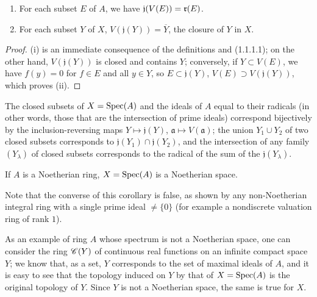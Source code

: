 \begin{proposition}[1.1.4]
\label{1.1.1.4}
\medskip\noindent
\begin{enumerate}
  \item[{\rm(i)}] For each subset $E$ of $A$, we have $\mathfrak{j}(V(E))=\mathfrak{r}(E)$.
  \item[{\rm(ii)}] For each subset $Y$ of $X$, $V(\mathfrak{j}(Y))=\overline{Y}$, the closure of $Y$ in $X$.
\end{enumerate}
\end{proposition}

\begin{proof}
\label{proof-1.1.1.4}
(i) is an immediate consequence of the definitions and (1.1.1.1);
on the other hand, $V(\mathfrak{j}(Y))$ is closed and contains $Y$;
conversely, if $Y\subset V(E)$, we have $f(y)=0$ for $f\in E$ and all $y\in Y$, so $E\subset\mathfrak{j}(Y)$, $V(E)\supset V(\mathfrak{j}(Y))$, which proves (ii).
\end{proof}

\begin{corollary}[1.1.5]
\label{1.1.1.5}
The closed subsets of $X=\operatorname{Spec}(A)$ and the ideals of $A$ equal to their radicals (in other words, those that are the intersection of prime ideals) correspond bijectively by the inclusion-reversing maps $Y\mapsto\mathfrak{j}(Y)$, $\mathfrak{a}\mapsto V(\mathfrak{a})$;
the union $Y_1\cup Y_2$ of two closed subsets corresponds to $\mathfrak{j}(Y_1)\cap\mathfrak{j}(Y_2)$, and the intersection of any family $(Y_\lambda)$ of closed subsets corresponds to the radical of the sum of the $\mathfrak{j}(Y_\lambda)$.
\end{corollary}

\begin{corollary}[1.1.6]
\label{1.1.1.6}
If $A$ is a Noetherian ring, $X=\operatorname{Spec}(A)$ is a Noetherian space.
\end{corollary}

Note that the converse of this corollary is false, as shown by any non-Noetherian integral ring with a single prime ideal $\neq\{0\}$ (for example a nondiscrete valuation ring of rank $1$).

As an example of ring $A$ whose spectrum is not a Noetherian space, one can consider the ring $\mathscr{C}(Y)$ of continuous real functions on an infinite compact space $Y$;
we know that, as a set, $Y$ corresponds to the set of maximal ideals of $A$, and it is easy to see that the topology induced on $Y$ by that of $X=\operatorname{Spec}(A)$ is the original topology of $Y$.
Since $Y$ is not a Noetherian space, the same is true for $X$.


